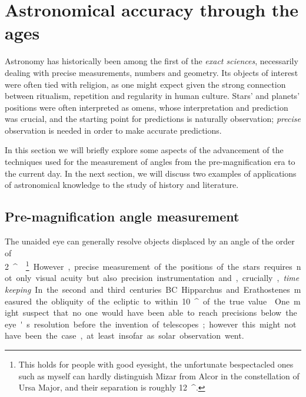 \documentclass[main.tex]{subfiles}
\begin{document}
\section{Astronomical accuracy through the ages}

Astronomy has historically been among the first of the \emph{exact sciences}, necessarily dealing with precise measurements, numbers and geometry.
Its objects of interest were often tied with religion, as one might expect given the strong connection between ritualism, repetition and regularity in human culture.
Stars' and planets' positions were often interpreted as omens, whose interpretation and prediction was crucial, and the starting point for predictions is naturally observation; \emph{precise} observation is needed in order to make accurate predictions. 

In this section we will briefly explore some aspects of the advancement of the techniques used for the measurement of angles from the pre-magnification era to the current day.
In the next section, we will discuss two examples of applications of astronomical knowledge to the study of history and literature. 

\subsection{Pre-magnification angle measurement}

The unaided eye can generally resolve objects displaced by an angle of the order of \SI{2}{^\prime} \cite[pag.\ 56]{karttunenObservationsInstruments2017}.\footnote{This holds for people with good eyesight, the unfortunate bespectacled ones such as myself can hardly distinguish Mizar from Alcor in the constellation of Ursa Major, and their separation is roughly \SI{12}{^\prime}. }
However, precise measurement of the positions of the stars requires not only visual acuity but also precision instrumentation and, crucially, \emph{timekeeping}. 

In the second and third centuries BC Hipparchus and Erathostenes measured the obliquity of the ecliptic to within \SI{10}{^\prime} of the true value \cite[pag.\ 109]{northCosmosIllustratedHistory2008}. 

One might suspect that no one would have been able to reach precisions below the eye's resolution before the invention of telescopes; however this might not have been the case, at least insofar as solar observation went.
\end{document}
